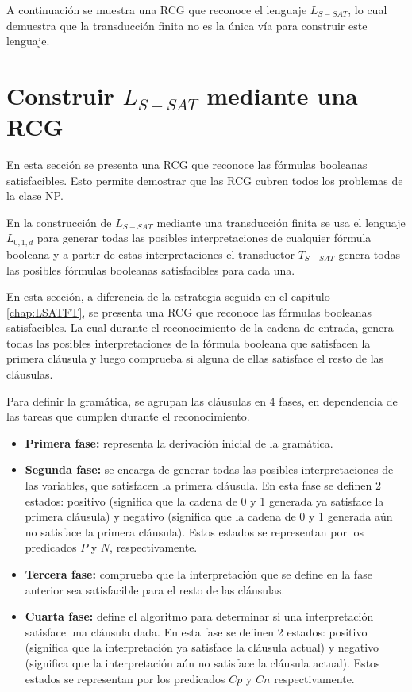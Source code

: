 A continuación se muestra una RCG que reconoce el lenguaje $L_{S-SAT}$, lo cual demuestra que la transducción
finita no es la única vía para construir este lenguaje.

\section{Construir $L_{S-SAT}$ mediante una RCG}

En esta sección se presenta una RCG que reconoce las fórmulas booleanas satisfacibles. Esto permite demostrar 
que las RCG cubren todos los problemas de la clase NP.

En la construcción de $L_{S-SAT}$ mediante una transducción finita se usa el lenguaje $L_{0,1,d}$ para generar todas las posibles interpretaciones de cualquier fórmula booleana y a partir de estas interpretaciones el transductor $T_{S-SAT}$ genera todas las posibles fórmulas booleanas satisfacibles para cada una. 

En esta sección, a diferencia de la estrategia seguida en el capitulo \ref{chap:LSATFT}, se presenta una RCG que 
reconoce las fórmulas booleanas satisfacibles. La cual durante el reconocimiento de la cadena de entrada, genera todas las posibles interpretaciones de la fórmula booleana que satisfacen la primera cláusula y luego comprueba si alguna de ellas satisface el resto de las cláusulas.

Para definir la gramática, se agrupan las cláusulas en 4 fases, en dependencia de las tareas que cumplen durante el reconocimiento.

\begin{itemize}
    \item \textbf{Primera fase:} representa la derivación inicial de la gramática.
    \item \textbf{Segunda fase:} se encarga de generar todas las posibles interpretaciones de las variables, que satisfacen la primera cláusula. En esta fase se definen 2 estados: positivo (significa que la cadena de 0 y 1 generada ya satisface la primera cláusula) y negativo (significa que la cadena de 0 y 1 generada aún no satisface la primera cláusula). Estos estados se representan por los predicados $P$ y $N$, respectivamente.
    \item \textbf{Tercera fase:} comprueba que la interpretación que se define en la fase anterior sea satisfacible para el resto de las cláusulas.
    \item \textbf{Cuarta fase:} define el algoritmo para determinar si una interpretación satisface una cláusula dada. En esta fase se definen 2 estados: positivo (significa que la interpretación ya satisface la cláusula actual) y negativo (significa que la interpretación aún no satisface la cláusula actual). Estos estados se representan por los predicados $Cp$ y $Cn$ respectivamente.
\end{itemize}

